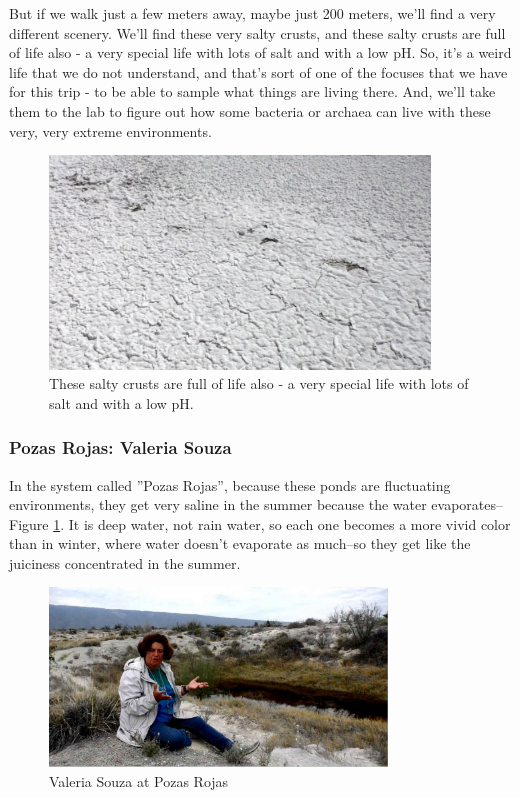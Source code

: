 \documentclass[]{article}
\begin{document}
But if we walk just a few meters away, maybe just 200 meters, we'll find a very different scenery. We'll find these very salty crusts, and these salty crusts are full of life also - a very special life with lots of salt and with a low pH. So, it's a weird life that we do not understand, and that's sort of one of the focuses that we have for this trip - to be able to sample what things are living there. And, we'll take them to the lab to figure out how some bacteria or archaea can live with these very, very extreme environments.

\begin{figure}[H]
	\caption[These salty crusts are full of life also]{These salty crusts are full of life also - a very special life with lots of salt and with a low pH.} 
	\includegraphics[width=0.9\textwidth]{CuatroCienegas5}
\end{figure}

\subsubsection{Pozas Rojas: Valeria Souza}

In the system called ''Pozas Rojas'', because these ponds are fluctuating environments, they get very saline in the summer because the water evaporates--Figure \ref{fig:PosasVS}. It is deep water, not rain water, so each one becomes a more vivid color than in winter, where water doesn't evaporate as much--so they get like the juiciness concentrated in the summer.

\begin{figure}[H]
	\begin{center}
		\caption{Valeria Souza at Pozas Rojas}\label{fig:PosasVS}
		\includegraphics[width=0.8\textwidth]{PosasVS}
	\end{center}
\end{figure}
\end{document}
